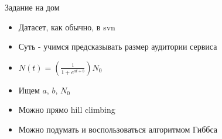 \documentclass[14pt, fleqn, xcolor={dvipsnames, table}]{beamer}
\begin{document}
\begin{frame}{Задание на дом}
\begin{itemize}
  \item Датасет, как обычно, в svn
  \item Суть - учимся предсказывать размер аудитории сервиса
  \item $N(t) = (\frac{1}{1 + e^{at+b}})N_0$
  \item Ищем $a$, $b$, $N_0$
  \item Можно прямо hill climbing
  \item Можно подумать и воспользоваться алгоритмом Гиббса 
\end{itemize}
\end{frame}
\end{document}
